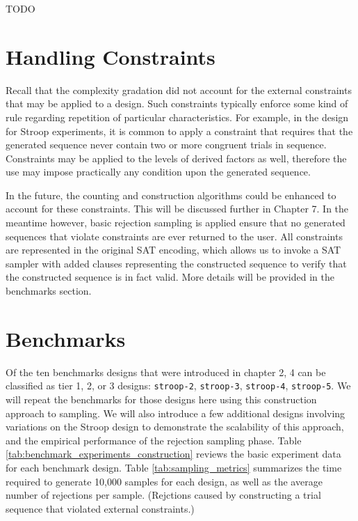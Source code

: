 TODO

\section{Handling Constraints}


Recall that the complexity gradation did not account for the external constraints that may be applied to a design. Such constraints typically enforce some kind of rule regarding repetition of particular characteristics. For example, in the design for Stroop experiments, it is common to apply a constraint that requires that the generated sequence never contain two or more congruent trials in sequence. Constraints may be applied to the levels of derived factors as well, therefore the use may impose practically any condition upon the generated sequence.

In the future, the counting and construction algorithms could be enhanced to account for these constraints. This will be discussed further in Chapter 7. In the meantime however, basic rejection sampling is applied ensure that no generated sequences that violate constraints are ever returned to the user. All constraints are represented in the original SAT encoding, which allows us to invoke a SAT sampler with added clauses representing the constructed sequence to verify that the constructed sequence is in fact valid. More details will be provided in the benchmarks section.


\section{Benchmarks}


Of the ten benchmarks designs that were introduced in chapter 2, 4 can be classified as tier 1, 2, or 3 designs: \texttt{stroop-2}, \texttt{stroop-3}, \texttt{stroop-4}, \texttt{stroop-5}. We will repeat the benchmarks for those designs here using this construction approach to sampling. We will also introduce a few additional designs involving variations on the Stroop design to demonstrate the scalability of this approach, and the empirical performance of the rejection sampling phase. Table \ref{tab:benchmark_experiments_construction} reviews the basic experiment data for each benchmark design. Table \ref{tab:sampling_metrics} summarizes the time required to generate 10,000 samples for each design, as well as the average number of rejections per sample. (Rejctions caused by constructing a trial sequence that violated external constraints.)

